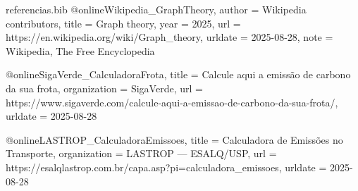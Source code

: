 \begin{filecontents*}{referencias.bib}
@online{Wikipedia_GraphTheory,
	author   = {{Wikipedia contributors}},
	title    = {Graph theory},
	year     = {2025},
	url      = {https://en.wikipedia.org/wiki/Graph_theory},
	urldate  = {2025-08-28},
	note     = {Wikipedia, The Free Encyclopedia}
}

@online{SigaVerde_CalculadoraFrota,
	title        = {Calcule aqui a emissão de carbono da sua frota},
	organization = {SigaVerde},
	url          = {https://www.sigaverde.com/calcule-aqui-a-emissao-de-carbono-da-sua-frota/},
	urldate      = {2025-08-28}
}

@online{LASTROP_CalculadoraEmissoes,
	title        = {Calculadora de Emissões no Transporte},
	organization = {LASTROP — ESALQ/USP},
	url          = {https://esalqlastrop.com.br/capa.asp?pi=calculadora_emissoes},
	urldate      = {2025-08-28}
}

\end{filecontents*}

\documentclass[
12pt,
a4paper,
semrecuonosumario,
sumario = abnt-6027-2012]{report}

\usepackage[T1]{fontenc}
\usepackage[utf8]{inputenc}
\usepackage[brazil]{babel}
\usepackage{geometry}
\geometry{a4paper,margin=2.5cm}
\usepackage{setspace}
\onehalfspacing
\usepackage{graphicx}
\usepackage{float}
\usepackage[hidelinks]{hyperref}
\usepackage{titlesec}
\usepackage{tocloft}
\usepackage{helvet}
\renewcommand{\familydefault}{\sfdefault}
\usepackage{ragged2e}
\usepackage{indentfirst}
\usepackage{subcaption}
\usepackage{amsmath}
\setcounter{MaxMatrixCols}{22}
\usepackage[style=authoryear,backend=biber]{biblatex}
\usepackage{textcomp}



\usepackage{listings}

\usepackage{algorithm}
\usepackage{algpseudocode}


